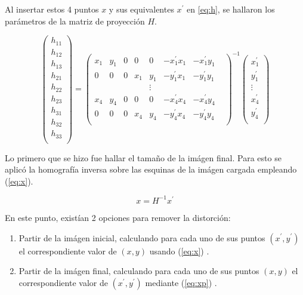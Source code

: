 \documentclass{IEEEtran}
\begin{document}
Al insertar estos 4 puntos $x$ y sus equivalentes $x^{'}$
en \ref{eq:h}, se hallaron los parámetros 
de la matriz de proyección $H$.

\begin{equation}
  \begin{pmatrix}
    h_{11} \\ h_{12} \\ h_{13}\\ h_{21} \\ h_{22} \\ h_{23}\\
    h_{31} \\ h_{32} \\ h_{33}\\
 \end{pmatrix}
 =
 \begin{pmatrix}
  x_1 & y_1 & 0 & 0 & 0 & -x_1^{'} x_1 & -x_1^{'} y_1 \\
  0 & 0 & 0 & x_1 & y_1 & -y_1^{'} x_1 & -y_1^{'} y_1 \\
    &   &   &     &  \vdots & & &  \\
  x_4 & y_4 & 0 & 0 & 0 & -x_4^{'} x_4 & -x_4^{'} y_4 \\
  0 & 0 & 0 & x_4 & y_4 & -y_4^{'} x_4 & -y_4^{'} y_4 \\
 \end{pmatrix}^{-1}
 \begin{pmatrix}
    x^{'}_1 \\ y^{'}_1 \\ \vdots \\ x^{'}_4 \\ y^{'}_4 \\
 \end{pmatrix}
\label{eq:h}
\end{equation} 

Lo primero que se hizo fue hallar el tamaño de la imágen 
final. Para esto se aplicó la homografía inversa sobre
las esquinas de la imágen cargada empleando (\ref{eq:x}).

\begin{equation}
x=H^{-1} x^{'}
\label{eq:x}
\end{equation} 

En este punto, existían 2 opciones para remover la 
distorción:
 
\begin{enumerate}
\item Partir de la imágen inicial, calculando para cada
uno de sus puntos $(x^{'},y^{'})$ el correspondiente valor
de $(x,y)$ usando (\ref{eq:x}) . 
\item Partir de la imágen final, calculando para cada
uno de sus puntos $(x,y)$ el correspondiente valor
de $(x^{'},y^{'})$ mediante (\ref{eq:xp}) . 
\end{enumerate} 
\end{document}
